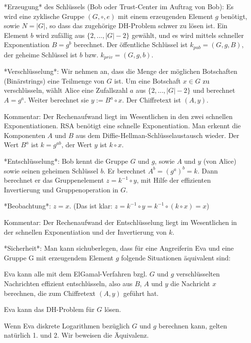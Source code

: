 \documentclass[a4paper]{article}
\begin{document}
\begin{multicols}{3}
        *Erzeugung* des Schlüssels (Bob oder Trust-Center im Auftrag von Bob): Es wird eine zyklische Gruppe $(G,\circ,e)$ mit einem erzeugenden Element $g$ benötigt, sowie $N=|G|$, so dass das zugehörige DH-Problem schwer zu lösen ist. Ein Element $b$ wird zufällig aus $\{2 ,...,|G|-2\}$ gewählt, und es wird mittels schneller Exponentiation $B=g^b$ berechnet. Der öffentliche Schlüssel ist $k_{pub}= (G,g,B)$, der geheime Schlüssel ist $b$ bzw. $k_{priv}=(G,g,b)$.

        *Verschlüsselung*: Wir nehmen an, dass die Menge der möglichen Botschaften (Binärstrings) eine Teilmenge von $G$ ist. Um eine Botschaft $x\in G$ zu verschlüsseln, wählt Alice eine Zufallszahl $a$ aus $\{2,...,|G|-2\}$ und berechnet $A=g^a$. Weiter berechnet sie $y:=B^a \circ x$. Der Chiffretext ist $(A,y)$.

        Kommentar: Der Rechenaufwand liegt im Wesentlichen in den zwei schnellen Exponentiationen. RSA benötigt eine schnelle Exponentiation. Man erkennt die Komponenten $A$ und $B$ aus dem Diffie-Hellman-Schlüsselaustausch wieder. Der Wert $B^a$ ist $k=g^{ab}$, der Wert $y$ ist $k\circ x$.

        *Entschlüsselung*: Bob kennt die Gruppe $G$ und $g$, sowie $A$ und $y$ (von Alice) sowie seinen geheimen Schlüssel $b$. Er berechnet $A^b= (g^a)^b=k$. Dann berechnet er das Gruppenelement $z=k^{-1}\circ y$, mit Hilfe der effizienten Invertierung und Gruppenoperation in $G$.

        *Beobachtung*: $z=x$. (Das ist klar: $z=k^{-1}\circ y=k^{-1}\circ(k\circ x) =x$)

        Kommentar: Der Rechenaufwand der Entschlüsselung liegt im Wesentlichen in der schnellen Exponentiation und der Invertierung von $k$.

        *Sicherheit*: Man kann sichuberlegen, dass für eine Angreiferin Eva und eine Gruppe G mit erzeugendem Element $g$ folgende Situationen äquivalent sind:
        \begin{enumerate*}
            \item Eva kann alle mit dem ElGamal-Verfahren bzgl. $G$ und $g$ verschlüsselten Nachrichten effizient entschlüsseln, also aus $B$, $A$ und $y$ die Nachricht $x$ berechnen, die zum Chiffretext $(A,y)$ geführt hat.
            \item Eva kann das DH-Problem für $G$ lösen.
        \end{enumerate*}

        Wenn Eva diskrete Logarithmen bezüglich $G$ und $g$ berechnen kann, gelten natürlich 1. und 2. Wir beweisen die Äquivalenz.


\end{multicols}
\end{document}
